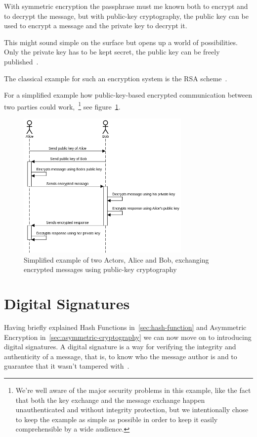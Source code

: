 With symmetric encryption the passphrase must me known both to encrypt and to decrypt the message,
but with public-key cryptography, the public key can be used to encrypt a message and the private key to decrypt it.

This might sound simple on the surface but opens up a world of possibilities.
Only the private key has to be kept secret, the public key can be freely published~\cite{stallings}.

The classical example for such an encryption system is the \gls{RSA} scheme~\cite{rsa}.

For a simplified example how public-key-based encrypted communication between two parties could work,~\footnote{
We're well aware of the major security problems in this example,
like the fact that both the key exchange and the message exchange happen unauthenticated and without integrity protection,
but we intentionally chose to keep the example as simple as possible in order to keep it easily comprehensible by a wide audience.
}
see figure~\ref{fig:simplepubkeycomm}.

\begin{figure}
    \centering
    \includegraphics[width=0.75\textwidth]{images/simplistic_pubkey_communication.png}
    \caption{Simplified example of two Actors, Alice and Bob, exchanging encrypted messages using public-key cryptography}
    \label{fig:simplepubkeycomm}
\end{figure}


\section{Digital Signatures}\label{sec:digital-signatures}
Having briefly explained Hash Functions in~\ref{sec:hash-function} and Asymmetric Encryption in~\ref{sec:asymmetric-cryptography} we can now move on to introducing digital signatures.
A digital signature is a way for verifying the integrity and authenticity of a message, that is,
to know who the message author is and to guarantee that it wasn't tampered with~\cite{digitalsignature}.

